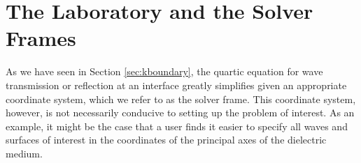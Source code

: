 \documentclass[11pt, reqno]{book}%
\newcounter{ct}
\begin{document}

\section{The Laboratory and the Solver Frames}
\label{sec:frames}

As we have seen in Section \ref{sec:kboundary}, the quartic equation for wave transmission or reflection at an interface greatly simplifies given an appropriate coordinate system, which we refer to as the solver frame. This coordinate system, however, is not necessarily conducive to setting up the problem of interest. As an example, it might be the case that a user finds it easier to specify all waves and surfaces of interest in the coordinates of the principal axes of the dielectric medium. 
\end{document}
